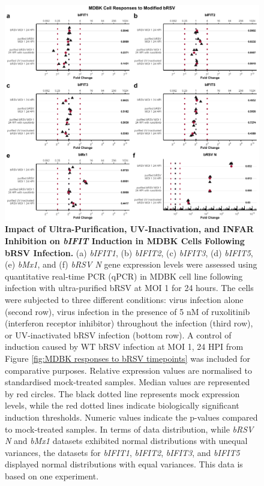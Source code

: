 \begin{figure}
    \centering
    \includegraphics[width=1\linewidth]{07. Chapter 2/Figs/02. Induction/04. mdbk_brsv_uv_roxo.pdf}
    \caption[Impact of Ultra-Purification, UV-Inactivation, and INFAR Inhibition on \textit{bIFIT} Induction in MDBK Cells Following bRSV Infection.]{\textbf{Impact of Ultra-Purification, UV-Inactivation, and INFAR Inhibition on \textit{bIFIT} Induction in MDBK Cells Following bRSV Infection.} (a) \textit{bIFIT1}, (b) \textit{bIFIT2}, (c) \textit{bIFIT3}, (d) \textit{bIFIT5}, (e) \textit{bMx1}, and (f) \textit{bRSV N} gene expression levels were assessed using quantitative real-time PCR (qPCR) in MDBK cell line following infection with ultra-purified bRSV at MOI 1 for 24 hours. The cells were subjected to three different conditions: virus infection alone (second row), virus infection in the presence of 5 nM of ruxolitinib (interferon receptor inhibitor) throughout the infection (third row), or UV-inactivated bRSV infection (bottom row). A control of induction caused by WT bRSV infection at MOI 1, 24 HPI from Figure \ref{fig:MDBK responses to bRSV timepoints} was included for comparative purposes. Relative expression values are normalised to standardised mock-treated samples. Median values are represented by red circles. The black dotted line represents mock expression levels, while the red dotted lines indicate biologically significant induction thresholds. Numeric values indicate the p-values compared to mock-treated samples. In terms of data distribution, while \textit{bRSV N} and \textit{bMx1} datasets exhibited normal distributions with unequal variances, the datasets for \textit{bIFIT1}, \textit{bIFIT2}, \textit{bIFIT3}, and \textit{bIFIT5} displayed normal distributions with equal variances. This data is based on one experiment.}
    \label{fig:The effect of ultra-purification, UV-inactivation and INFR inhibition on hIFIT induction following hRSV infection in MDBK}
\end{figure}

